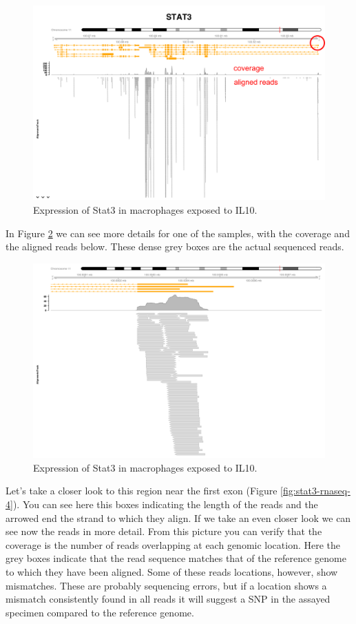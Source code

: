 \documentclass[]{book}
\theoremstyle{definition}
\theoremstyle{definition}
\theoremstyle{definition}
\theoremstyle{remark}
\begin{document}
\begin{figure}
\includegraphics[width=20.85in]{pic/stat3_rnaseq_2} \caption{Expression of Stat3 in macrophages exposed to IL10.}\label{fig:stat3-rnaseq-2}
\end{figure}

In Figure \ref{fig:stat3-rnaseq-3} we can see more details for one of
the samples, with the coverage and the aligned reads below. These dense
grey boxes are the actual sequenced reads.

\begin{figure}
\includegraphics[width=20.83in]{pic/stat3_rnaseq_3} \caption{Expression of Stat3 in macrophages exposed to IL10.}\label{fig:stat3-rnaseq-3}
\end{figure}

Let's take a closer look to this region near the first exon (Figure
\ref{fig:stat3-rnaseq-4}). You can see here this boxes indicating the
length of the reads and the arrowed end the strand to which they align.
If we take an even closer look we can see now the reads in more detail.
From this picture you can verify that the coverage is the number of
reads overlapping at each genomic location. Here the grey boxes indicate
that the read sequence matches that of the reference genome to which
they have been aligned. Some of these reads locations, however, show
mismatches. These are probably sequencing errors, but if a location
shows a mismatch consistently found in all reads it will suggest a SNP
in the assayed specimen compared to the reference genome.
\end{document}
